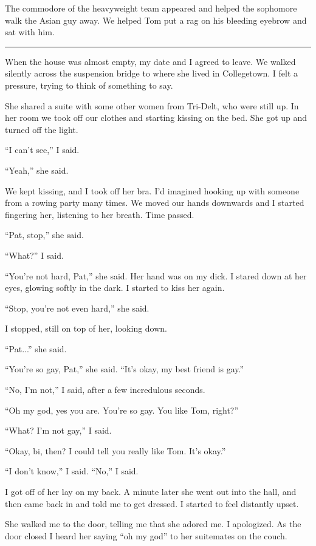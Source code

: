 The commodore of the heavyweight team appeared and helped the sophomore walk the
Asian guy away.  We helped Tom put a rag on his bleeding eyebrow and sat with
him.  

\plainfancybreak{12pt}{2}{* * *}

When the house was almost empty, my date and I agreed to leave.  We walked
silently across the suspension bridge to where she lived in Collegetown.  I felt
a pressure, trying to think of something to say.

She shared a suite with some other women from Tri-Delt, who were still up.  In
her room we took off our clothes and starting kissing on the bed.  She got up
and turned off the light.

``I can't see,'' I said.  

``Yeah,'' she said.

We kept kissing, and I took off her bra.  I'd imagined hooking up with someone
from a rowing party many times.  We moved our hands downwards and I started
fingering her, listening to her breath.  Time passed.

``Pat, stop,'' she said.

``What?'' I said.

``You're not hard, Pat,'' she said.  Her hand was on my dick.  I stared down at
her eyes, glowing softly in the dark.  I started to kiss her again.

``Stop, you're not even hard,'' she said.

I stopped, still on top of her, looking down.

``Pat...'' she said.

``You're so gay, Pat,'' she said.  ``It's okay, my best friend is gay.''

``No, I'm not,'' I said, after a few incredulous seconds.

``Oh my god, yes you are.  You're so gay.  You like Tom, right?''

``What?  I'm not gay,'' I said.

``Okay, bi, then?  I could tell you really like Tom.  It's okay.''

``I don't know,'' I said.  ``No,'' I said.

I got off of her lay on my back.  A minute later she went out into the hall, and
then came back in and told me to get dressed.  I started to feel distantly
upset.

She walked me to the door, telling me that she adored me.  I apologized.  As the
door closed I heard her saying ``oh my god'' to her suitemates on the couch.

